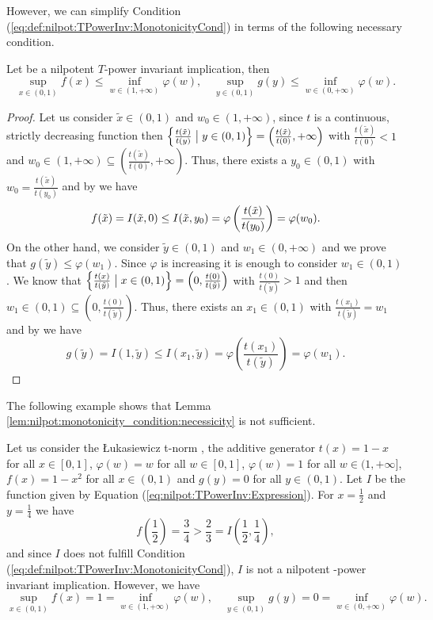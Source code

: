 However, we can simplify Condition (\ref{eq:def:nilpot:TPowerInv:MonotonicityCond}) in terms of the following necessary condition.
\begin{lemma}\label{lem:nilpot:monotonicity_condition:necessicity}
	Let \IT be a nilpotent $T$-power invariant implication, then
	\begin{equation*}
		\sup_{x \in (0,1)} f(x) \leq \inf_{w \in (1,+\infty)} \varphi(w), \quad \sup_{y \in (0,1)} g(y) \leq \inf_{w \in (0,+\infty)} \varphi(w).
	\end{equation*}
\end{lemma}
\begin{proof}
	Let us consider $\tilde{x} \in (0,1)$ and $w_0 \in (1,+\infty)$,  since $t$ is a continuous, strictly decreasing function then $\left\lbrace \frac{t(\tilde{x})}{t(y)} \bigm| y \in (0,1) \right\rbrace = \left(\frac{t(\tilde{x})}{t(0)},+\infty\right)$ with $\frac{t(\tilde{x})}{t(0)}<1$ and $ w_0 \in (1,+\infty)\subseteq \left (\frac{t(\tilde{x})}{t(0)},+\infty\right )$. Thus, there exists a $y_0 \in (0,1)$ with $w_0 = \frac{t(\tilde{x})}{t(y_0)}$ and by \Itwo we have
	$$f(\tilde{x}) = I(\tilde{x},0) \leq I(\tilde{x},y_0) = \varphi \left(\frac{t(\tilde{x})}{t(y_0)}\right)=\varphi(w_0).$$
	On the other hand, we consider $\tilde{y} \in (0,1)$ and $w_1 \in (0,+\infty)$ and we prove that $g(\tilde{y}) \leq \varphi(w_1)$. Since $\varphi$ is increasing it is enough to consider $w_1 \in (0,1)$. We know that $\left\lbrace \frac{t(x)}{t(\tilde{y})} \bigm| x \in (0,1)\right\rbrace = \left(0,\frac{t(0)}{t(\tilde{y})}\right)$ with $\frac{t(0)}{t(\tilde{y})}>1$ and then $w_1 \in (0,1)\subseteq \left(0,\frac{t(0)}{t(\tilde{y})}\right)$. Thus, there exists an $x_1 \in (0,1)$ with $\frac{t(x_1)}{t(\tilde{y})}=w_1$ and  by \Ione we have
	$$g(\tilde{y})=I(1,\tilde{y}) \leq I(x_1,\tilde{y})=\varphi\left(\frac{t(x_1)}{t(\tilde{y})}\right) =\varphi(w_1).$$
\end{proof}

The following example shows that Lemma \ref{lem:nilpot:monotonicity_condition:necessicity} is not sufficient.

\begin{example}
	Let us consider the Łukasiewicz t-norm \TLK, the additive generator $t(x)=1-x$ for all $x \in [0,1]$, $\varphi(w)=w$ for all $w \in [0,1]$, $\varphi(w)=1$ for all $w \in (1,+\infty]$, $f(x)=1-x^2$ for all $x \in (0,1)$ and $g(y)=0$ for all $ y \in (0,1)$. Let $I$ be the function given by Equation (\ref{eq:nilpot:TPowerInv:Expression}). For $x=\frac{1}{2}$ and $y=\frac{1}{4}$ we have
	$$f\left( \frac{1}{2} \right) = \frac{3}{4} > \frac{2}{3} = I\left(\frac{1}{2},\frac{1}{4}\right),$$
	and since $I$ does not fulfill Condition (\ref{eq:def:nilpot:TPowerInv:MonotonicityCond}), $I$ is not a nilpotent \TLK-power invariant implication. However, we have
	$$\sup_{x \in (0,1)} f(x) = 1= \inf_{w \in (1,+\infty)} \varphi(w), \quad \sup_{y \in (0,1)} g(y)=0 = \inf_{w \in (0,+\infty)} \varphi(w).$$
\end{example}

